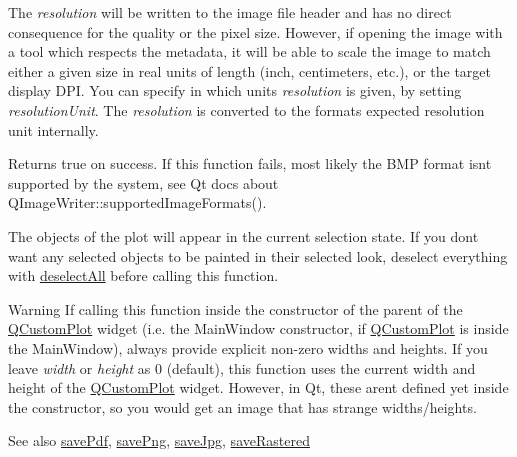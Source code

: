 The {\itshape resolution} will be written to the image file header and has no direct consequence for the quality or the pixel size. However, if opening the image with a tool which respects the metadata, it will be able to scale the image to match either a given size in real units of length (inch, centimeters, etc.), or the target display D\+PI. You can specify in which units {\itshape resolution} is given, by setting {\itshape resolution\+Unit}. The {\itshape resolution} is converted to the format\textquotesingle{}s expected resolution unit internally.

Returns true on success. If this function fails, most likely the B\+MP format isn\textquotesingle{}t supported by the system, see Qt docs about Q\+Image\+Writer\+::supported\+Image\+Formats().

The objects of the plot will appear in the current selection state. If you don\textquotesingle{}t want any selected objects to be painted in their selected look, deselect everything with \hyperlink{classQCustomPlot_a9d4808ab925b003054085246c92a257c}{deselect\+All} before calling this function.

\begin{DoxyWarning}{Warning}
If calling this function inside the constructor of the parent of the \hyperlink{classQCustomPlot}{Q\+Custom\+Plot} widget (i.\+e. the Main\+Window constructor, if \hyperlink{classQCustomPlot}{Q\+Custom\+Plot} is inside the Main\+Window), always provide explicit non-\/zero widths and heights. If you leave {\itshape width} or {\itshape height} as 0 (default), this function uses the current width and height of the \hyperlink{classQCustomPlot}{Q\+Custom\+Plot} widget. However, in Qt, these aren\textquotesingle{}t defined yet inside the constructor, so you would get an image that has strange widths/heights.
\end{DoxyWarning}
\begin{DoxySeeAlso}{See also}
\hyperlink{classQCustomPlot_ad5acd34f6b39c3516887d7e54fec2412}{save\+Pdf}, \hyperlink{classQCustomPlot_ac92cc9256d12f354b40a4be4600b5fb9}{save\+Png}, \hyperlink{classQCustomPlot_a76f0d278e630a711fa6f48048cfd83e4}{save\+Jpg}, \hyperlink{classQCustomPlot_ad7723ce2edfa270632ef42b03a444352}{save\+Rastered} 
\end{DoxySeeAlso}
